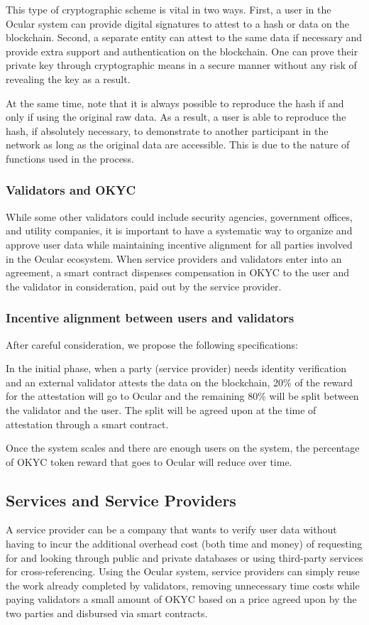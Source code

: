 \documentclass[12pt]{article}
\let\tempone\itemize
\let\temptwo\enditemize
\renewenvironment{itemize}{\tempone\addtolength{\itemsep}{-5pt}}{\temptwo}
\begin{document}
This type of cryptographic scheme is vital in two ways. First, a user in the Ocular system can provide digital signatures to attest to a hash or data on the blockchain. Second, a separate entity can attest to the same data if necessary and provide extra support and authentication on the blockchain. One can prove their private key through cryptographic means in a secure manner without any risk of revealing the key as a result.

At the same time, note that it is always possible to reproduce the hash if and only if using the original raw data. As a result, a user is able to reproduce the hash, if absolutely necessary, to demonstrate to another participant in the network as long as the original data are accessible. This is due to the nature of functions used in the process.

\subsubsection*{Validators and OKYC}
While some other validators could include security agencies, government offices, and utility companies, it is important to have a systematic way to organize and approve user data while maintaining incentive alignment for all parties involved in the Ocular ecosystem. When service providers and validators enter into an agreement, a smart contract dispenses compensation in OKYC to the user and the validator in consideration, paid out by the service provider. 
\subsubsection* {Incentive alignment between users and validators}
After careful consideration, we propose the following specifications:
\begin{itemize}
\item In the initial phase, when a party (service provider) needs identity verification and an external validator attests the data on the blockchain, 20\% of the reward for the attestation will go to Ocular and the remaining 80\% will be split between the validator and the user. The split will be agreed upon at the time of attestation through a smart contract. 
\item Once the system scales and there are enough users on the system, the percentage of OKYC token reward that goes to Ocular will reduce over time. 
\end{itemize}

\subsection{Services and Service Providers}
A service provider can be a company that wants to verify user data without having to incur the additional overhead cost (both time and money) of requesting for and looking through public and private databases or using third-party services for cross-referencing. Using the Ocular system, service providers can simply reuse the work already completed by validators, removing unnecessary time costs while paying validators a small amount of OKYC based on a price agreed upon by the two parties and disbursed via smart contracts.
\end{document}
